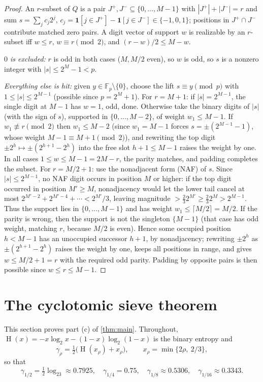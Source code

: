 \documentclass[11pt]{article}
\theoremstyle{definition}
\newcommand{\F}{\mathbb F}
\newcommand{\HH}{\operatorname{H}}
\begin{document}
\begin{proof}
An $r$-subset of $Q$ is a pair $J^+,J^-\subseteq\{0,\dots,M-1\}$ with $|J^+|+|J^-|=r$ and sum $s=\sum_jc_j2^j$, $c_j=\mathbf1[j\in J^+]-\mathbf1[j\in J^-]\in\{-1,0,1\}$; positions in $J^+\cap J^-$ contribute matched zero pairs.  A digit vector of support $w$ is realizable by an $r$-subset iff $w\le r$, $w\equiv r\pmod2$, and $(r-w)/2\le M-w$.

\emph{$0$ is excluded:} $r$ is odd in both cases ($M,M/2$ even), so $w$ is odd, so $s$ is a nonzero integer with $|s|\le2^M-1<p$.

\emph{Everything else is hit:} given $y\in\F_p\setminus\{0\}$, choose the lift $s\equiv y\pmod p$ with $1\le|s|\le2^{M-1}$ (possible since $p=2^M+1$).  For $r=M+1$: if $|s|=2^{M-1}$, the single digit at $M-1$ has $w=1$, odd, done.  Otherwise take the binary digits of $|s|$ (with the sign of $s$), supported in $\{0,\dots,M-2\}$, of weight $w_1\le M-1$.  If $w_1\not\equiv r\pmod2$ then $w_1\le M-2$ (since $w_1=M-1$ forces $s=\pm(2^{M-1}-1)$, whose weight $M-1\equiv M+1\pmod 2$), and rewriting the top digit $\pm2^h\mapsto\pm(2^{h+1}-2^h)$ into the free slot $h+1\le M-1$ raises the weight by one.  In all cases $1\le w\le M-1=2M-r$, the parity matches, and padding completes the subset.  For $r=M/2+1$: use the nonadjacent form (NAF) of $s$.  Since $|s|\le 2^{M-1}$, no NAF digit occurs in position $M$ or higher: if the top digit occurred in position $M'\ge M$, nonadjacency would let the lower tail cancel at most $2^{M'-2}+2^{M'-4}+\cdots<2^{M'}/3$, leaving magnitude $>\tfrac23 2^{M'}\ge\tfrac23 2^{M}>2^{M-1}$.  Thus the support lies in $\{0,\dots,M-1\}$ and has weight $w_1\le\lceil M/2\rceil=M/2$.  If the parity is wrong, then the support is not the singleton $\{M-1\}$ (that case has odd weight, matching $r$, because $M/2$ is even).  Hence some occupied position $h<M-1$ has an unoccupied successor $h+1$, by nonadjacency; rewriting $\pm2^h$ as $\pm(2^{h+1}-2^h)$ raises the weight by one, keeps all positions in range, and gives $w\le M/2+1=r$ with the required odd parity.  Padding by opposite pairs is then possible since $w\le r\le M-1$.
\end{proof}

\section{The cyclotomic sieve theorem}\label{sec:sieve}

This section proves part (c) of \cref{thm:main}.  Throughout, $\HH(x)=-x\log_2x-(1-x)\log_2(1-x)$ is the binary entropy and
\[
        \gamma_\rho
        =\tfrac12\big(\HH(x_\rho)+x_\rho\big),
        \qquad
        x_\rho=\min\{2\rho,\ 2/3\},
\]
so that
\[
        \gamma_{1/2}=\tfrac12\log_23\approx0.7925,\quad
        \gamma_{1/4}=0.75,\quad
        \gamma_{1/8}\approx0.5306,\quad
        \gamma_{1/16}\approx0.3343 .
\]
\end{document}
